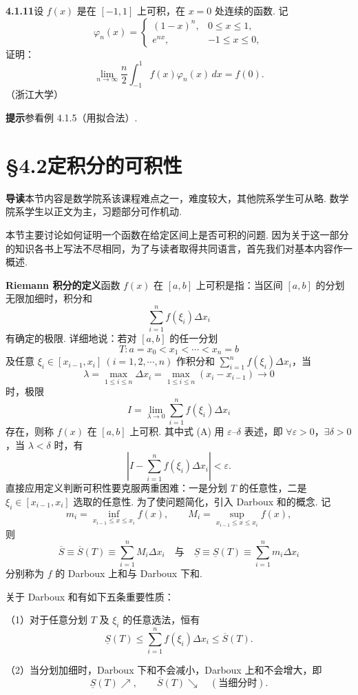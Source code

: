 \documentclass[UTF8,12pt,a4paper,fontset=fandol]{ctexart}
\begin{document}
\noindent\textbf{4.1.11}\quad 设 $f(x)$ 是在 $[-1,1]$ 上可积，在 $x=0$ 处连续的函数. 记
\[
\varphi_n(x)=
\begin{cases}
(1-x)^n, & 0\le x\le1,\\
e^{nx}, & -1\le x\le0,
\end{cases}
\]
证明：
\[
\lim_{n\to\infty}\frac n2\int_{-1}^1f(x)\varphi_n(x)\,dx=f(0).
\]
（浙江大学）

\noindent\textbf{提示}\quad 参看例 4.1.5（用拟合法）.

\section*{§4.2\quad 定积分的可积性}

\noindent\textbf{导读}\quad 本节内容是数学院系该课程难点之一，难度较大，其他院系学生可从略. 数学院系学生以正文为主，习题部分可作机动.

本节主要讨论如何证明一个函数在给定区间上是否可积的问题. 因为关于这一部分的知识各书上写法不尽相同，为了与读者取得共同语言，首先我们对基本内容作一概述.

\noindent\textbf{Riemann 积分的定义}\quad 函数 $f(x)$ 在 $[a,b]$ 上可积是指：当区间 $[a,b]$ 的分划无限加细时，积分和
\[
\sum_{i=1}^n f(\xi_i)\Delta x_i
\]
有确定的极限. 详细地说：若对 $[a,b]$ 的任一分划
\[
T:a=x_0<x_1<\cdots<x_n=b
\]
及任意 $\xi_i\in[x_{i-1},x_i]\ (i=1,2,\cdots,n)$ 作积分和 $\sum_{i=1}^n f(\xi_i)\Delta x_i$，当
\[
\lambda=\max_{1\le i\le n}\Delta x_i
=\max_{1\le i\le n}(x_i-x_{i-1})\to0
\]
时，极限
\[
I=\lim_{\lambda\to0}\sum_{i=1}^n f(\xi_i)\Delta x_i
\tag{A}
\]
存在，则称 $f(x)$ 在 $[a,b]$ 上可积. 其中式 (A) 用 $\varepsilon$--$\delta$ 表述，即 $\forall\varepsilon>0$，$\exists\delta>0$，当 $\lambda<\delta$ 时，有
\[
\left|I-\sum_{i=1}^n f(\xi_i)\Delta x_i\right|<\varepsilon.
\tag{B}
\]
直接应用定义判断可积性要克服两重困难：一是分划 $T$ 的任意性，二是 $\xi_i\in[x_{i-1},x_i]$ 选取的任意性. 为了使问题简化，引入 Darboux 和的概念. 记
\[
m_i=\inf_{x_{i-1}\le x\le x_i}f(x),\qquad
M_i=\sup_{x_{i-1}\le x\le x_i}f(x),
\]
则
\[
\overline S\equiv\overline S(T)\equiv\sum_{i=1}^nM_i\Delta x_i
\quad\text{与}\quad
\underline S\equiv\underline S(T)\equiv\sum_{i=1}^nm_i\Delta x_i
\]
分别称为 $f$ 的 Darboux 上和与 Darboux 下和.

关于 Darboux 和有如下五条重要性质：

（1）对于任意分划 $T$ 及 $\xi_i$ 的任意选法，恒有
\[
\underline S(T)\le\sum_{i=1}^n f(\xi_i)\Delta x_i\le\overline S(T).
\]

（2）当分划加细时，Darboux 下和不会减小，Darboux 上和不会增大，即
\[
\underline S(T)\nearrow,\qquad \overline S(T)\searrow\quad(\text{当细分时}).
\]
\end{document}
